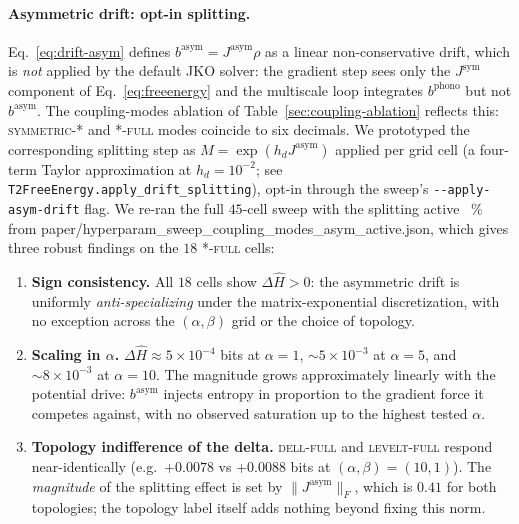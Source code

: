 \documentclass[11pt]{article}
\begin{document}
\paragraph{Asymmetric drift: opt-in splitting.}
Eq.~\eqref{eq:drift-asym} defines $b^{\mathrm{asym}} =
J^{\mathrm{asym}}\rho$ as a linear non-conservative drift, which is
\emph{not} applied by the default JKO solver: the gradient step
sees only the $J^{\mathrm{sym}}$ component of
Eq.~\eqref{eq:freeenergy} and the multiscale loop integrates
$b^{\mathrm{phono}}$ but not $b^{\mathrm{asym}}$. The coupling-modes
ablation of Table~\ref{sec:coupling-ablation} reflects this:
\textsc{symmetric-*} and \textsc{*-full} modes coincide to six
decimals. We prototyped the corresponding splitting step as
$M = \exp(h_d J^{\mathrm{asym}})$ applied per grid cell (a four-term
Taylor approximation at $h_d = 10^{-2}$; see
\texttt{T2FreeEnergy.apply\_drift\_splitting}), opt-in through the
sweep's \texttt{-{}-apply-asym-drift} flag. We re-ran the full
$45$-cell sweep with the splitting active~%
{\small\% from paper/hyperparam\_sweep\_coupling\_modes\_asym\_active.json},
which gives three robust findings on the $18$ \textsc{*-full}
cells:
\begin{enumerate}
  \item \textbf{Sign consistency.} All $18$ cells show
        $\Delta \hat H > 0$: the asymmetric drift is uniformly
        \emph{anti-specializing} under the matrix-exponential
        discretization, with no exception across the
        $(\alpha, \beta)$ grid or the choice of topology.
  \item \textbf{Scaling in $\alpha$.}
        $\Delta \hat H \approx 5 \times 10^{-4}$ bits at
        $\alpha = 1$, $\sim 5 \times 10^{-3}$ at $\alpha = 5$, and
        $\sim 8 \times 10^{-3}$ at $\alpha = 10$. The magnitude
        grows approximately linearly with the potential drive:
        $b^{\mathrm{asym}}$ injects entropy in proportion to the
        gradient force it competes against, with no observed
        saturation up to the highest tested $\alpha$.
  \item \textbf{Topology indifference of the delta.}
        \textsc{dell-full} and \textsc{levelt-full} respond
        near-identically (e.g.\ $+0.0078$ vs $+0.0088$ bits at
        $(\alpha, \beta) = (10, 1)$). The \emph{magnitude} of the
        splitting effect is set by $\|J^{\mathrm{asym}}\|_F$,
        which is $0.41$ for both topologies; the topology label
        itself adds nothing beyond fixing this norm.
\end{enumerate}
\end{document}
